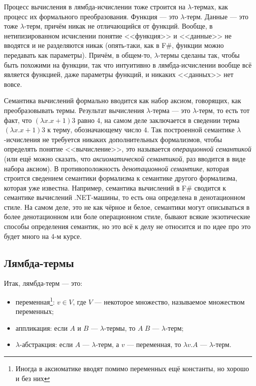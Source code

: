 \documentclass[a5paper]{article}
\begin{document}
Процесс вычисления в лямбда-исчислении тоже строится на $\lambda$-термах, как процесс их формального преобразования. Функция --- это $\lambda$-терм. Данные --- это тоже $\lambda$-терм, причём никак не отличающийся от функций. Вообще, в нетипизированном исчислении понятие <<функция>> и <<данные>> не вводятся и не разделяются никак (опять-таки, как в F\#, функции можно передавать как параметры). Причём, в общем-то, $\lambda$-термы сделаны так, чтобы быть похожими на функции, так что интуитивно в лямбда-исчислении вообще всё является функцией, даже параметры функций, и никаких <<данных>> нет вовсе.

Семантика вычислений формально вводится как набор аксиом, говорящих, как преобразовывать термы. Результат вычисления $\lambda$-терма --- это $\lambda$-терм, то есть тот факт, что $(\lambda x.x + 1) 3$ равно $4$, на самом деле заключается в сведении терма $(\lambda x.x + 1) 3$ к терму, обозначающему число $4$. Так построенной семантике $\lambda$-исчисления не требуется никаких дополнительных формализмов, чтобы определять понятие <<вычисление>>, это называется \textit{операционной семантикой} (или ещё можно сказать, что \textit{аксиоматической семантикой}, раз вводится в виде набора аксиом). В противоположность \textit{денотационной семантике}, которая строится сведением семантики формализма к семантике другого формализма, которая уже известна. Например, семантика вычислений в F\# сводится к семантике вычислений .NET-машины, то есть она определена в денотационном стиле. На самом деле, это не как чёрное и белое, семантики могут описываться в более денотационном или боле операционном стиле, бывают всякие экзотические способы определения семантик, но это всё к делу не относится и по идее про это будет много на 4-м курсе.

\subsection{Лямбда-термы}

Итак, лямбда-терм --- это:

\begin{itemize}
    \item переменная\footnote{Иногда в аксиоматике вводят помимо переменных ещё константы, но хорошо и без них}: $v \in V$, где $V$ --- некоторое множество, называемое множеством переменных;
    \item аппликация: если $A$ и $B$ --- $\lambda$-термы, то $A \; B$ --- $\lambda$-терм;
    \item $\lambda$-абстракция: если $A$ --- $\lambda$-терм, а $v$ --- переменная, то $\lambda v. A$ --- $\lambda$-терм.
\end{itemize}
\end{document}
